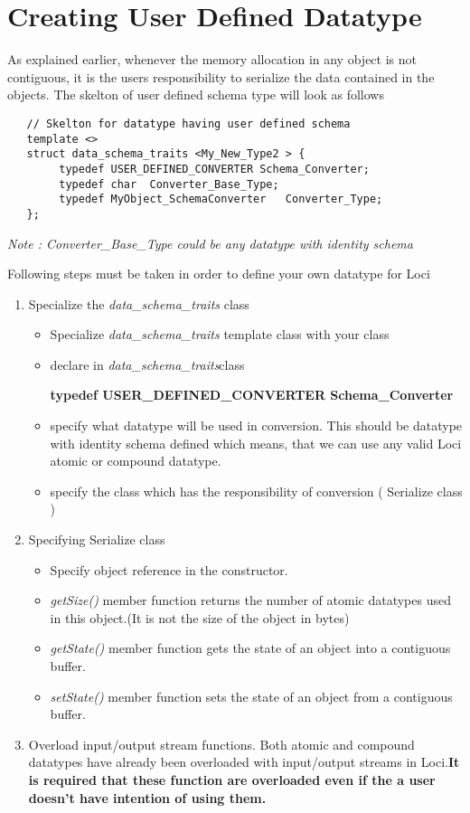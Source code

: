 \section{Creating User Defined Datatype}
\par As explained earlier, whenever the memory allocation in any object is
not contiguous, it is the users responsibility to serialize the
data contained in the objects.  The skelton of user defined schema type
will look as follows
\begin{verbatim}
   // Skelton for datatype having user defined schema
   template <>
   struct data_schema_traits <My_New_Type2 > {
        typedef USER_DEFINED_CONVERTER Schema_Converter;
        typedef char  Converter_Base_Type;
        typedef MyObject_SchemaConverter   Converter_Type;
   };
\end{verbatim}
\par {\em Note : Converter\_Base\_Type could be any datatype with identity schema}
\par Following steps must be taken in order to define your own datatype
for Loci
\begin{enumerate} 
\item Specialize the {\em data\_schema\_traits} class
\begin{itemize}
\item Specialize {\em data\_schema\_traits} template class with your
class
\item \par declare in {\em data\_schema\_traits}class
\begin{center}
{\bf typedef USER\_DEFINED\_CONVERTER Schema\_Converter}
\end{center}
\item specify what datatype will be used in conversion. This should be 
datatype with identity schema defined which means, that we can use any 
valid Loci atomic or compound datatype.
\item specify the class which has the responsibility of conversion (
Serialize class )
\end{itemize}
\item Specifying Serialize class
\begin{itemize}
\item Specify object reference in the constructor.
\item {\em getSize()} member function returns the number of
atomic datatypes used in this object.(It is not the size of the object in bytes)
\item {\em getState()} member function gets the state of an
object into a contiguous buffer.
\item {\em setState()} member function sets the state of an
object from a contiguous buffer.
\end{itemize}
\item Overload input/output stream functions.
Both atomic and compound datatypes have already been overloaded with
input/output streams in Loci.{\bf It is required that these function 
are overloaded even if the a user doesn't have intention of
using them.}
\end{enumerate}
